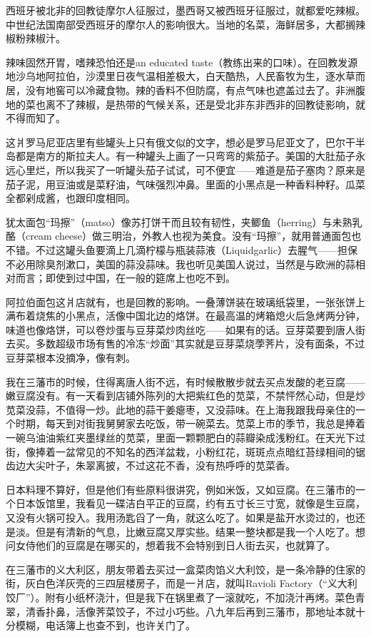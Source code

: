 \par 西班牙被北非的回教徒摩尔人征服过，墨西哥又被西班牙征服过，就都爱吃辣椒。中世纪法国南部受西班牙的摩尔人的影响很大。当地的名菜，海鲜居多，大都搁辣椒粉辣椒汁。
\par 辣味固然开胃，嗜辣恐怕还是an educated taste（教练出来的口味）。在回教发源地沙乌地阿拉伯，沙漠里日夜气温相差极大，白天酷热，人民畜牧为生，逐水草而居，没有地窖可以冷藏食物。辣的香料不但防腐，有点气味也遮盖过去了。非洲腹地的菜也离不了辣椒，是热带的气候关系，还是受北非东非西非的回教徒影响，就不得而知了。
\par 这爿罗马尼亚店里有些罐头上只有俄文似的文字，想必是罗马尼亚文了，巴尔干半岛都是南方的斯拉夫人。有一种罐头上画了一只弯弯的紫茄子。美国的大肚茄子永远心里烂，所以我买了一听罐头茄子试试，可不便宜——难道是茄子塞肉？原来是茄子泥，用豆油或是菜籽油，气味强烈冲鼻。里面的小黑点是一种香料种籽。瓜菜全都剁成酱，也跟印度相同。
\par 犹太面包“玛擦”（matso）像苏打饼干而且较有韧性，夹鲫鱼（herring）与未熟乳酪（cream cheese）做三明治，外教人也视为美食。没有“玛擦”，就用普通面包也不错。不过这罐头鱼要滴上几滴柠檬与瓶装蒜液（Liquidgarlic）去腥气——担保不必用除臭剂漱口，美国的蒜没蒜味。我也听见美国人说过，当然是与欧洲的蒜相对而言；即使到过中国，在一般的筵席上也吃不到。
\par 阿拉伯面包这爿店就有，也是回教的影响。一叠薄饼装在玻璃纸袋里，一张张饼上满布着烧焦的小黑点，活像中国北边的烙饼。在最高温的烤箱熄火后急烤两分钟，味道也像烙饼，可以卷炒蛋与豆芽菜炒肉丝吃——如果有的话。豆芽菜要到唐人街去买。多数超级市场有售的冷冻“炒面”其实就是豆芽菜烧荸荠片，没有面条，不过豆芽菜根本没摘净，像有刺。
\par 我在三藩市的时候，住得离唐人街不远，有时候散散步就去买点发酸的老豆腐——嫩豆腐没有。有一天看到店铺外陈列的大把紫红色的苋菜，不禁怦然心动，但是炒苋菜没蒜，不值得一炒。此地的蒜干姜瘪枣，又没蒜味。在上海我跟我母亲住的一个时期，每天到对街我舅舅家去吃饭，带一碗菜去。苋菜上市的季节，我总是捧着一碗乌油油紫红夹墨绿丝的苋菜，里面一颗颗肥白的蒜瓣染成浅粉红。在天光下过街，像捧着一盆常见的不知名的西洋盆栽，小粉红花，斑斑点点暗红苔绿相间的锯齿边大尖叶子，朱翠离披，不过这花不香，没有热呼呼的苋菜香。
\par 日本料理不算好，但是他们有些原料很讲究，例如米饭，又如豆腐。在三藩市的一个日本饭馆里，我看见一碟洁白平正的豆腐，约有五寸长三寸宽，就像是生豆腐，又没有火锅可投入。我用汤匙舀了一角，就这么吃了。如果是盐开水烫过的，也还是淡。但是有清新的气息，比嫩豆腐又厚实些。结果一整块都是我一个人吃了。想问女侍他们的豆腐是在哪买的，想着我不会特别到日人街去买，也就算了。
\par 在三藩市的义大利区，朋友带着去买过一盒菜肉馅义大利饺，是一条冷静的住家的街，灰白色洋灰壳的三四层楼房子，而是一爿店，就叫Ravioli Factory（“义大利饺厂”）。附有小纸杯浇汁，但是我下在锅里煮了一滚就吃，不加浇汁再烤。菜色青翠，清香扑鼻，活像荠菜饺子，不过小巧些。八九年后再到三藩市，那地址本就十分模糊，电话簿上也查不到，也许关门了。
